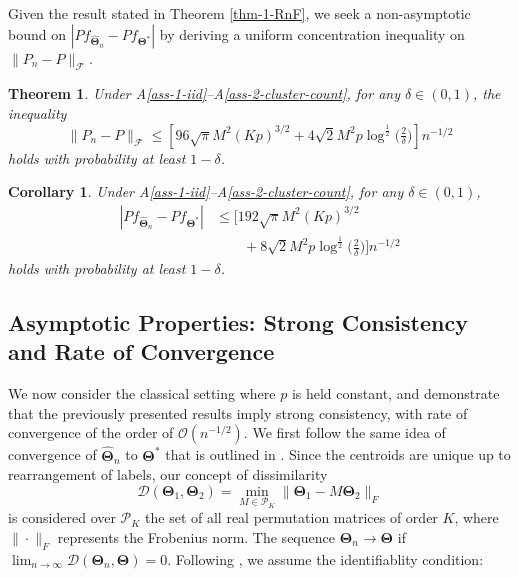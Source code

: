 \documentclass{article}
\newcommand{\bTheta}{\boldsymbol{\Theta}}
\newcommand{\hth}{\widehat{\bTheta}_n}
\newtheorem{thm}{Theorem}[section]
\newtheorem{lemma}{Lemma}[section]
\newtheorem{cor}{Corollary}[section]
\begin{document}

Given the result stated in Theorem \ref{thm-1-RnF}, we seek a non-asymptotic bound on $|P f_{\widehat{\bm{\Theta}}_n}-Pf_{\bm{\Theta}^*}|$ by deriving a uniform concentration inequality on $\|P_n-P\|_{\mathcal{F}}$.

\begin{thm}\label{thm-2-diff-Pn-P}
    Under A\ref{ass-1-iid}--A\ref{ass-2-cluster-count}, for any $\delta\in(0,1)$, the inequality 
    \[\|P_n-P\|_\mathcal{F}\le \left[96\sqrt{\pi}M^2(Kp)^{3/2} + 4\sqrt{2} M^2p\log^{\frac{1}{2}}\big(\tfrac{2}{\delta}\big) \right] n^{-1/2}\]
    holds with probability at least $1-\delta$.
\end{thm}


\begin{cor}
    Under A\ref{ass-1-iid}--A\ref{ass-2-cluster-count}, for any $\delta\in(0,1)$,%
    \begin{align*}
    |P f_{\widehat{\bm{\Theta}}_n}-Pf_{\bm{\Theta}^*}| &\le \Big[192\sqrt{\pi}M^2(Kp)^{3/2}\\
    &\qquad+ 8\sqrt{2} M^2p\log^{\frac{1}{2}}\big(\tfrac{2}{\delta}\big) \Big] n^{-1/2}
    \end{align*}
    holds with probability at least $1-\delta$.
\end{cor}


\subsection{Asymptotic Properties: Strong Consistency and Rate of Convergence}

We now consider the classical setting where $p$ is held constant, and demonstrate that the previously presented results imply strong consistency, with rate of convergence of the order of $\mathcal{O}(n^{-1/2})$. We first follow the same idea of convergence of $\hth$ to $\bTheta^\ast$ that is outlined in \cite{pollard1981strong}. Since the centroids are unique up to rearrangement of labels, our concept of dissimilarity
\[\mathcal{D}(\bTheta_1,\bTheta_2) = \min_{M \in \mathscr{P}_K} \|\bTheta_1 - M \bTheta_2\|_F \]
is considered over $\mathscr{P}_K$ the set of all real permutation matrices of order $K$, where $\|\cdot\|_F$ represents the
Frobenius norm. The sequence $\bTheta_n\to \bTheta$ if $\lim_{n\to \infty} \mathcal{D}(\bTheta_n,\bTheta)=0$. Following \cite{terada2014strong,chakraborty2020entropy}, we assume the identifiablity condition:
\end{document}
